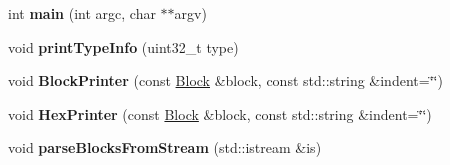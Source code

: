 \begin{DoxyCompactItemize}
\item 
int {\bfseries main} (int argc, char $\ast$$\ast$argv)\hypertarget{namespacendn_ab64450f029080a1772d831fa63cd81d4}{}\label{namespacendn_ab64450f029080a1772d831fa63cd81d4}

\item 
void {\bfseries print\+Type\+Info} (uint32\+\_\+t type)\hypertarget{namespacendn_a7b756c56733e53dcbb9cc9e94820eae0}{}\label{namespacendn_a7b756c56733e53dcbb9cc9e94820eae0}

\item 
void {\bfseries Block\+Printer} (const \hyperlink{classndn_1_1Block}{Block} \&block, const std\+::string \&indent=\char`\"{}\char`\"{})\hypertarget{namespacendn_add56bc643db057181af1db08206d9fd2}{}\label{namespacendn_add56bc643db057181af1db08206d9fd2}

\item 
void {\bfseries Hex\+Printer} (const \hyperlink{classndn_1_1Block}{Block} \&block, const std\+::string \&indent=\char`\"{}\char`\"{})\hypertarget{namespacendn_a257b297101164320f13f5f6163dffe9d}{}\label{namespacendn_a257b297101164320f13f5f6163dffe9d}

\item 
void {\bfseries parse\+Blocks\+From\+Stream} (std\+::istream \&is)\hypertarget{namespacendn_a00aef625b10774ba0b1c14e4b07c68f7}{}\label{namespacendn_a00aef625b10774ba0b1c14e4b07c68f7}

\end{DoxyCompactItemize}
